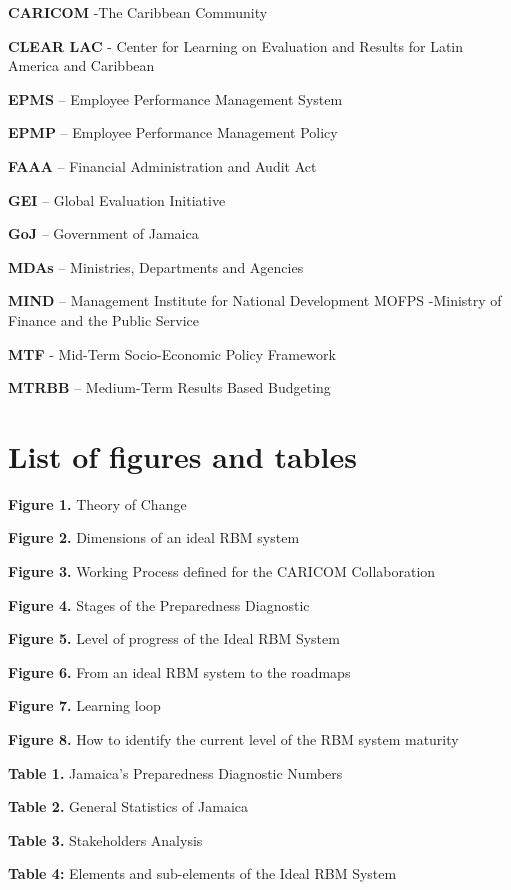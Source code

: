 \documentclass[
  10pt,
]{book}
\begin{document}
\textbf{CARICOM} -The Caribbean Community

\textbf{CLEAR LAC} - Center for Learning on Evaluation and Results for Latin America and Caribbean

\textbf{EPMS} -- Employee Performance Management System

\textbf{EPMP} -- Employee Performance Management Policy

\textbf{FAAA} -- Financial Administration and Audit Act

\textbf{GEI} -- Global Evaluation Initiative

\textbf{GoJ} -- Government of Jamaica

\textbf{MDAs} -- Ministries, Departments and Agencies

\textbf{MIND} -- Management Institute for National Development MOFPS -Ministry of Finance and the Public Service

\textbf{MTF} - Mid-Term Socio-Economic Policy Framework

\textbf{MTRBB} -- Medium-Term Results Based Budgeting

\hypertarget{list-of-figures-and-tables}{%
\chapter*{List of figures and tables}\label{list-of-figures-and-tables}}

\textbf{Figure 1.} Theory of Change

\textbf{Figure 2.} Dimensions of an ideal RBM system

\textbf{Figure 3.} Working Process defined for the CARICOM Collaboration

\textbf{Figure 4.} Stages of the Preparedness Diagnostic

\textbf{Figure 5.} Level of progress of the Ideal RBM System

\textbf{Figure 6.} From an ideal RBM system to the roadmaps

\textbf{Figure 7.} Learning loop

\textbf{Figure 8.} How to identify the current level of the RBM system maturity

\textbf{Table 1.} Jamaica's Preparedness Diagnostic Numbers

\textbf{Table 2.} General Statistics of Jamaica

\textbf{Table 3.} Stakeholders Analysis

\textbf{Table 4:} Elements and sub-elements of the Ideal RBM System
\end{document}
